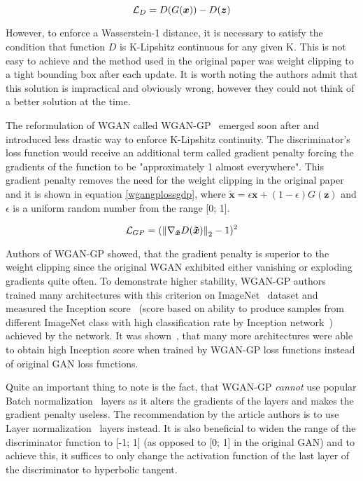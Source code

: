 \begin{equation}
\mathcal{L}_D = D(G(\bm{x})) - D(\bm{z})
\label{wganlossd}
\end{equation}

However, to enforce a Wasserstein-1 distance, it is necessary to satisfy the condition that function $D$ is K-Lipshitz continuous for any given K. This is not easy to achieve and the method used in the original paper was weight clipping to a tight bounding box after each update. It is worth noting the authors admit that this solution is impractical and obviously wrong, however they could not think of a better solution at the time.

The reformulation of WGAN called WGAN-GP~\cite{wgan-gp} emerged soon after and introduced less drastic way to enforce K-Lipshitz continuity. The discriminator's loss function would receive an additional term called gradient penalty forcing the gradients of the function to be "approximately 1 almost everywhere". This gradient penalty removes the need for the weight clipping in the original paper and it is shown in equation \ref{wgangplossgdp}, where $\bm{\tilde{x}} = \epsilon\bm{x} + (1 - \epsilon)G(\bm{z})$ and $\epsilon$ is a uniform random number from the range [0; 1].

\begin{equation}
\mathcal{L}_{GP} = (\left\lVert\nabla_{\bm{\tilde{x}}}D(\bm{\tilde{x}})\right\rVert_2 - 1)^2
\label{wgangplossgdp}
\end{equation}

Authors of WGAN-GP showed, that the gradient penalty is superior to the weight clipping since the original WGAN exhibited either vanishing or exploding gradients quite often. To demonstrate higher stability, WGAN-GP authors trained many architectures with this criterion on ImageNet~\cite{imagenet} dataset and measured the Inception score~\cite{improvedgan} (score based on ability to produce samples from different ImageNet class with high classification rate by Inception network~\cite{inception}) achieved by the network. It was shown~\cite{wgan-gp}, that many more architectures were able to obtain high Inception score when trained by WGAN-GP loss functions instead of original GAN loss functions.

Quite an important thing to note is the fact, that WGAN-GP {\em cannot} use popular Batch normalization~\cite{batchnorm} layers as it alters the gradients of the layers and makes the gradient penalty useless. The recommendation by the article authors is to use Layer normalization~\cite{layernorm} layers instead. It is also beneficial to widen the range of the discriminator function to [-1; 1] (as opposed to [0; 1] in the original GAN) and to achieve this, it suffices to only change the activation function of the last layer of the discriminator to hyperbolic tangent.

